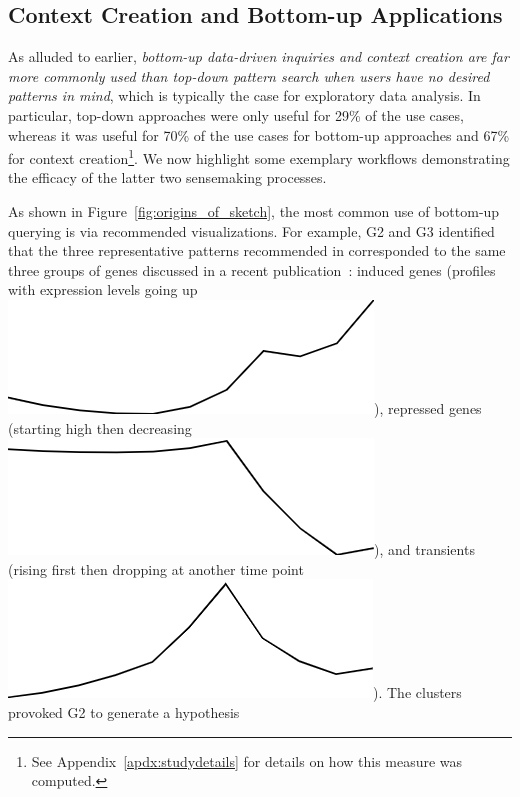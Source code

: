  \subsection{Context Creation and Bottom-up Applications}%
 \par As alluded to earlier,
 \emph{bottom-up data-driven inquiries
 and context creation are far more commonly
 used than top-down pattern search
 when users have no desired patterns in mind},
 which is typically the case for exploratory data analysis.
 In particular, top-down approaches
 were only useful for 29\% of the use cases,
 whereas it was useful for 70\% of the use cases
 for bottom-up approaches and 67\%
 for context creation\footnote{See Appendix~\ref{apdx:studydetails} for details on how this measure was computed.}. We now highlight some exemplary workflows demonstrating the efficacy of the latter two sensemaking processes.
 \par As shown in Figure~\ref{fig:origins_of_sketch},
 the most common use of bottom-up querying
 is via recommended visualizations. For example, G2 and G3 identified that
 the three representative patterns
 recommended in \zvpp corresponded
 to the same three groups of genes discussed
 in a recent publication~\cite{Gloss2017}:
 induced genes (profiles with expression levels going up \includegraphics[width=2\baselineskip,keepaspectratio]{figures/induced.png}),
 repressed genes (starting high then decreasing \includegraphics[width=2\baselineskip,keepaspectratio]{figures/repressed.png}),
 and transients (rising first then dropping at another time point \includegraphics[width=2\baselineskip,keepaspectratio]{figures/transient.png}). The clusters provoked G2 to generate a hypothesis

